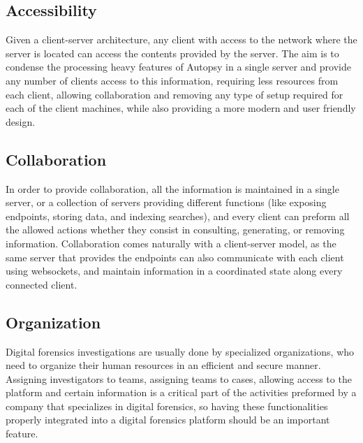 \subsection{Accessibility}

Given a client-server architecture, any client with access to the network where the server is located can access the contents provided by the server.
The aim is to condense the processing heavy features of Autopsy in a single server and provide any number of clients access to this information, requiring less 
resources from each client, allowing collaboration and removing any type of setup required for each of the client machines, while also providing a more modern 
and user friendly design.

\subsection{Collaboration}

In order to provide collaboration, all the information is maintained in a single server, or a collection of servers providing different functions (like exposing endpoints,
storing data, and indexing searches), and every client can preform all the allowed actions whether they consist in consulting, generating, or removing information. 
Collaboration comes naturally with a client-server model, as the same server that provides the endpoints can also communicate with each client using websockets, and maintain 
information in a coordinated state along every connected client.

\subsection{Organization}

Digital forensics investigations are usually done by specialized organizations, who need to organize their human resources in an efficient and secure manner.
Assigning investigators to teams, assigning teams to cases, allowing access to the platform and certain information is a critical part of the activities preformed by
a company that specializes in digital forensics, so having these functionalities properly integrated into a digital forensics platform should be an important feature.
